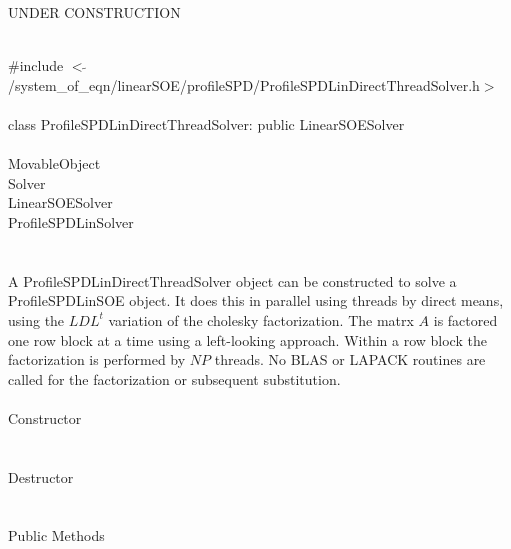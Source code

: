 
UNDER CONSTRUCTION

   \\
\indent \#include $<\tilde{
}$/system\_of\_eqn/linearSOE/profileSPD/ProfileSPDLinDirectThreadSolver.h$>$
\\ 

  \\
\indent class ProfileSPDLinDirectThreadSolver: public LinearSOESolver  \\

 \\
\indent MovableObject \\
\indent\indent  Solver \\
\indent\indent\indent LinearSOESolver \\
\indent\indent\indent\indent ProfileSPDLinSolver \\
\indent\indent\indent\indent{} \\

  \\
\indent A ProfileSPDLinDirectThreadSolver object can be constructed to
solve a ProfileSPDLinSOE object. It does this in parallel using
threads by direct means, using the $LDL^t$ variation of the cholesky
factorization. The matrx $A$ is factored one row block at a time using
a left-looking approach. Within a row block the factorization is
performed by $NP$ threads. No BLAS or LAPACK routines are called 
for the factorization or subsequent substitution. \\

  \\
\indent\indent Constructor \\
\indent{}  \\ \\
\indent\indent Destructor \\
\indent{}\\  \\
\indent\indent Public Methods \\
\indent{} \\
\indent{} \\
\indent{} \\ 
\indent{} \\ 


